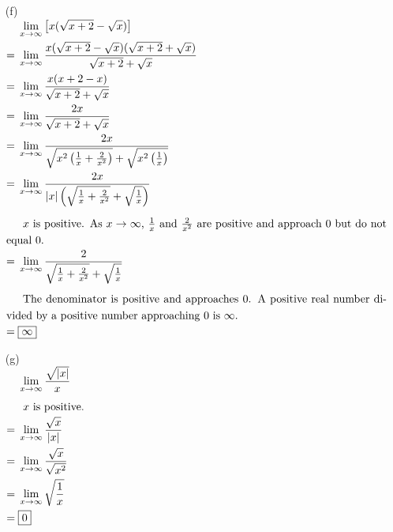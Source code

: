 \documentclass{article}
\newcommand{\alignedintertext}[1]{%
  \noalign{%
    \vskip\belowdisplayshortskip
    \vtop{\hsize=\linewidth#1\par
    \expandafter}%
    \expandafter\prevdepth\the\prevdepth
  }%
}
\newcommand*{\paren}[1]{\ensuremath\left(#1\right)}
\newcommand*{\limit}[2][x]{\ensuremath{\displaystyle\lim_{#1\to#2}}}
\newcommand*{\Limit}[3][x]{\ensuremath{\displaystyle\lim_{#1\to#2}\left[#3\right]}}
\begin{document}
\begin{multicols}{2}
\begin{itemize}
	\item[(f)]
	$\begin{aligned}[t]
		&\Limit{\infty}{x(\sqrt{x+2}-\sqrt{x})} \\
		={}&\limit{\infty}\frac{x(\sqrt{x+2}-\sqrt{x})(\sqrt{x+2}+\sqrt{x})}{\sqrt{x+2}+\sqrt{x}} \\
		={}&\limit{\infty}\frac{x(x+2-x)}{\sqrt{x+2}+\sqrt{x}} \\
		={}&\limit{\infty}\frac{2x}{\sqrt{x+2}+\sqrt{x}} \\
		={}&\limit{\infty}\frac{2x}{\sqrt{x^2\paren{\frac{1}{x}+\frac{2}{x^2}}}+\sqrt{x^2\paren{\frac{1}{x}}}} \\
		={}&\limit{\infty}\frac{2x}{|x|\paren{\sqrt{\frac{1}{x}+\frac{2}{x^2}}+\sqrt{\frac{1}{x}}}} \\
		\alignedintertext{$x$ is positive. As $x\to\infty$, $\frac{1}{x}$ and $\frac{2}{x^2}$ are positive and approach $0$ but do not equal $0$.}
		={}&\limit{\infty}\frac{2}{\sqrt{\frac{1}{x}+\frac{2}{x^2}}+\sqrt{\frac{1}{x}}} \\
		\alignedintertext{The denominator is positive and approaches $0$. A positive real number divided by a positive number approaching $0$ is $\infty$.}
		={}&\boxed{\infty}
	\end{aligned}$

	\item[(g)]
	$\begin{aligned}[t]
		&\limit{\infty}\frac{\sqrt{|x|}}{x} \\
		\alignedintertext{$x$ is positive.}
		={}&\limit{\infty}\frac{\sqrt{x}}{|x|} \\
		={}&\limit{\infty}\frac{\sqrt{x}}{\sqrt{x^2}} \\
		={}&\limit{\infty}\sqrt{\frac{1}{x}} \\
		={}&\boxed{0}
	\end{aligned}$
\end{itemize}
\end{multicols}
\end{document}
